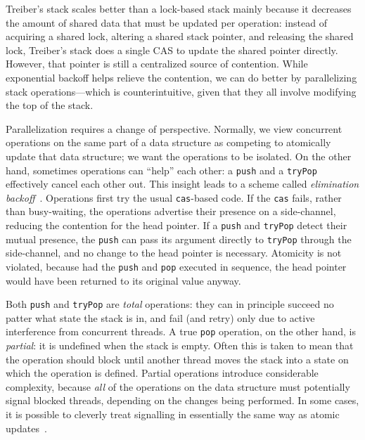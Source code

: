 \documentclass[preprint,nocopyrightspace]{sigplanconf}
\begin{document}


Treiber's stack scales better than a lock-based stack mainly because it
decreases the amount of shared data that must be updated per operation: instead
of acquiring a shared lock, altering a shared stack pointer, and releasing the
shared lock, Treiber's stack does a single CAS to update the shared pointer
directly.  However, that pointer is still a centralized source of contention.
While exponential backoff helps relieve the contention, we can do better by
parallelizing stack operations---which is counterintuitive, given that they all
involve modifying the top of the stack.

Parallelization requires a change of perspective.  Normally, we view concurrent
operations on the same part of a data structure as competing to atomically
update that data structure; we want the operations to be isolated.  On the other
hand, sometimes operations can ``help'' each other: a \lstinline{push} and a
\lstinline{tryPop} effectively cancel each other out.  This insight leads to a
scheme called \emph{elimination backoff}~\cite{Shavit1997a,Hendler2004}.
Operations first try the usual \lstinline{cas}-based code.  If the
\lstinline{cas} fails, rather than busy-waiting, the operations advertise their
presence on a side-channel, reducing the contention for the head pointer.  If a
\lstinline{push} and \lstinline{tryPop} detect their mutual presence, the
\lstinline{push} can pass its argument directly to \lstinline{tryPop} through
the side-channel, and no change to the head pointer is necessary.  Atomicity is
not violated, because had the \lstinline{push} and \lstinline{pop} executed in
sequence, the head pointer would have been returned to its original value
anyway.

Both \lstinline{push} and \lstinline{tryPop} are \emph{total} operations: they
can in principle succeed no patter what state the stack is in, and fail (and
retry) only due to active interference from concurrent threads.  A true
\lstinline{pop} operation, on the other hand, is \emph{partial}: it is undefined
when the stack is empty.  Often this is taken to mean that the operation should
block until another thread moves the stack into a state on which the operation
is defined.  Partial operations introduce considerable complexity, because
\emph{all} of the operations on the data structure must potentially signal
blocked threads, depending on the changes being performed.  In some cases, it is
possible to cleverly treat signalling in essentially the same way as atomic
updates~\cite{Scherer2004}.
\end{document}
